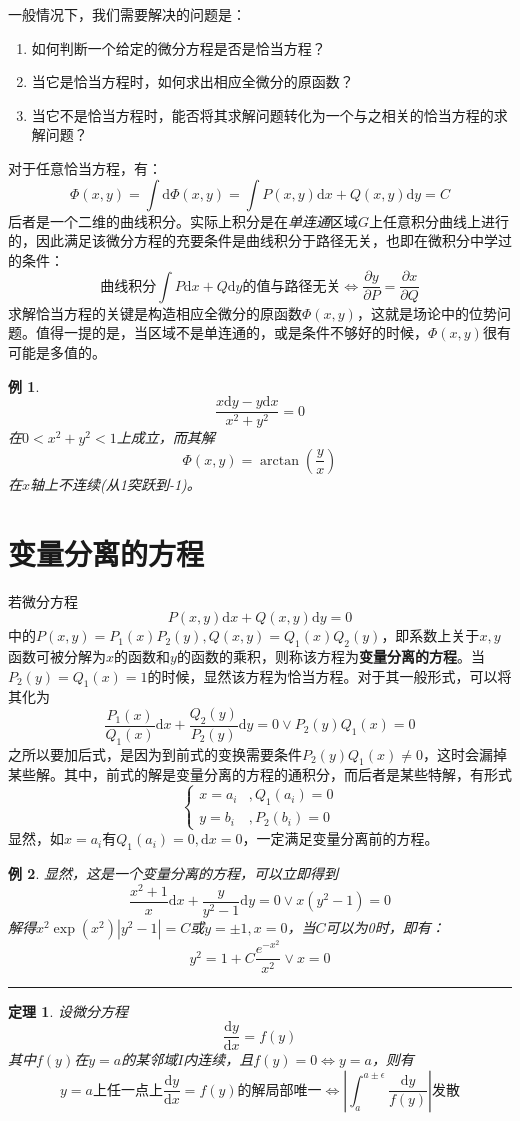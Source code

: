\documentclass[UTF8]{book}
\renewcommand{\d}{\mathrm{d}}
\newtheorem{theorem}{定理}
\newtheorem{example}{例}
\begin{document}
    一般情况下，我们需要解决的问题是：\begin{enumerate}
        \item 如何判断一个给定的微分方程是否是恰当方程？
        \item 当它是恰当方程时，如何求出相应全微分的原函数？
        \item 当它不是恰当方程时，能否将其求解问题转化为一个与之相关的恰当方程的求解问题？
    \end{enumerate}
    对于任意恰当方程，有：$$ \varPhi(x,y)=\int \d \varPhi(x,y)=\int P(x,y)\d x+Q(x,y)\d y=C $$
    后者是一个二维的曲线积分。实际上积分是在\emph{单连通}区域$ G $上任意积分曲线上进行的，因此满足该微分方程的充要条件是曲线积分于路径无关，也即在微积分中学过的条件：$$ \text{曲线积分}\int P\d x+Q\d y\text{的值与路径无关}\iff \frac{\partial y}{\partial P}=\frac{\partial x}{\partial Q} $$
    求解恰当方程的关键是构造相应全微分的原函数$ \varPhi(x,y) $，这就是场论中的位势问题。值得一提的是，当区域不是单连通的，或是条件不够好的时候，$ \varPhi(x,y) $很有可能是多值的。
    \begin{example}
        $$ \frac{x\d y-y\d x}{x^2+y^2}=0 $$在$ 0<x^2+y^2<1 $上成立，而其解$$ \varPhi(x,y)=\arctan (\frac{y}{x})$$在$ x $轴上不连续(从1突跃到-1)。
    \end{example}
    \section{变量分离的方程}
    若微分方程$$ P(x,y)\d x+Q(x,y)\d y=0 $$中的$ P(x,y)=P_1(x)P_2(y),Q(x,y)=Q_1(x)Q_2(y) $，即系数上关于$ x,y $函数可被分解为$ x $的函数和$ y $的函数的乘积，则称该方程为\textbf{变量分离的方程}。当$ P_2(y)=Q_1(x)=1 $的时候，显然该方程为恰当方程。对于其一般形式，可以将其化为$$ \frac{P_1(x)}{Q_1(x)}\d x+\frac{Q_2(y)}{P_2(y)}\d y=0 \lor P_2(y)Q_1(x)=0$$
    之所以要加后式，是因为到前式的变换需要条件$P_2(y)Q_1(x)\neq 0$，这时会漏掉某些解。其中，前式的解是变量分离的方程的通积分，而后者是某些特解，有形式$$\begin{cases}
        x=a_i&,Q_1(a_i)=0\\  y=b_i&,P_2(b_i)=0
    \end{cases}$$显然，如$x=a_i$有$Q_1(a_i)=0,\d x=0$，一定满足变量分离前的方程。
    \begin{example}
        显然，这是一个变量分离的方程，可以立即得到$$\frac{x^2+1}{x}\d x+\frac{y}{y^2-1}\d y=0\lor x(y^2-1)=0$$解得$x^2\exp(x^2)|y^2-1|=C$或$y=\pm 1,x=0$，当$C$可以为0时，即有：$$y^2=1+C\frac{e^{-x^2}}{x^2}\lor x=0$$
    \end{example}
    \rule{\textwidth}{1pt}
    \begin{theorem}
        设微分方程$$\frac{\d y}{\d x}=f(y)$$其中$f(y)$在$y=a$的某邻域$I$内连续，且$f(y)=0\iff y=a$，则有$$y=a\text{上任一点上}\frac{\d y}{\d x}=f(y)\text{的解局部唯一}\iff \left|\int^{a\pm \epsilon}_a \frac{\d y}{f(y)}\right|\text{发散}$$
    \end{theorem}
\end{document}
